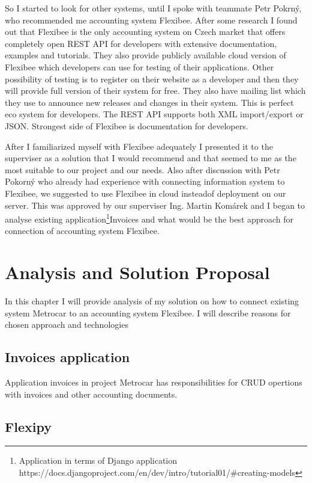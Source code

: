 \documentclass[11pt,twoside,a4paper]{book}
\begin{document}
So I started to look for other systems, until I spoke with teammate Petr
Pokrný, who recommended me accounting system Flexibee\cite{flexibee}. After some research I found out that Flexibee is 
the only accounting system on Czech market that offers completely open REST API for developers with extensive documentation, examples and tutorials. They also provide publicly available cloud version of Flexibee which developers can use for testing of their applications. Other possibility of testing is to register on their website as a developer and then they will provide full version of their system for free. They also have mailing list which they use to announce new releases and changes in their system. This is perfect eco system for developers. The REST API supports both XML import/export or JSON. Strongest side of Flexibee is documentation for developers. 

After I familiarized myself with Flexibee adequately I presented it to the superviser as a solution that I would recommend and that seemed to me as the most suitable to our project and our needs. Also after discussion with Petr Pokorný who already had experience with connecting information system to Flexibee, we suggested to use Flexibee in cloud insteadof deployment on our server. This was approved by our superviser Ing. Martin Komárek and I began to analyse existing application\footnote{Application in terms of Django application https://docs.djangoproject.com/en/dev/intro/tutorial01/\#creating-models}Invoices and what would be the best approach for connection of accounting system Flexibee. 


\chapter{Analysis and Solution Proposal}
In this chapter I will provide analysis of my solution on how to connect existing system Metrocar to an accounting system Flexibee. I will describe reasons for chosen approach and technologies
\section{Invoices application}
Application invoices in project Metrocar has responsibilities for CRUD opertions with invoices and other accounting documents. 

\section{Flexipy}
\end{document}
